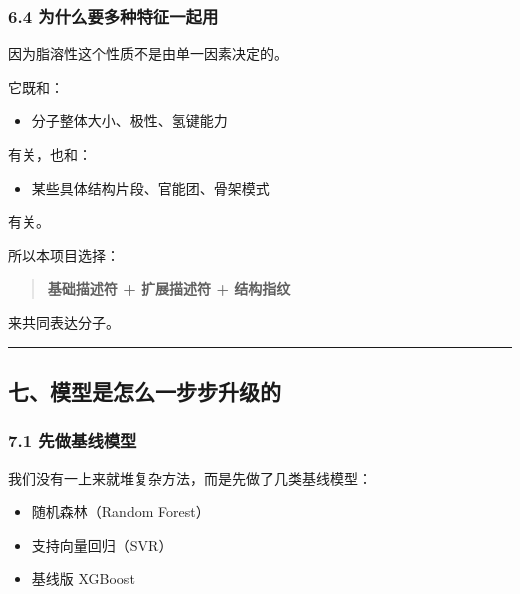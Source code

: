 \documentclass[
  ,
]{ctexart}
\providecommand{\tightlist}{%
  \setlength{\itemsep}{0pt}\setlength{\parskip}{0pt}}
\begin{document}
\hypertarget{ux4e3aux4ec0ux4e48ux8981ux591aux79cdux7279ux5f81ux4e00ux8d77ux7528}{%
\subsubsection{6.4
为什么要多种特征一起用}\label{ux4e3aux4ec0ux4e48ux8981ux591aux79cdux7279ux5f81ux4e00ux8d77ux7528}}

因为脂溶性这个性质不是由单一因素决定的。

它既和：

\begin{itemize}
\tightlist
\item
  分子整体大小、极性、氢键能力
\end{itemize}

有关，也和：

\begin{itemize}
\tightlist
\item
  某些具体结构片段、官能团、骨架模式
\end{itemize}

有关。

所以本项目选择：

\begin{quote}
\textbf{基础描述符 + 扩展描述符 + 结构指纹}
\end{quote}

来共同表达分子。

\begin{center}\rule{0.5\linewidth}{0.5pt}\end{center}

\hypertarget{ux4e03ux6a21ux578bux662fux600eux4e48ux4e00ux6b65ux6b65ux5347ux7ea7ux7684}{%
\subsection{七、模型是怎么一步步升级的}\label{ux4e03ux6a21ux578bux662fux600eux4e48ux4e00ux6b65ux6b65ux5347ux7ea7ux7684}}

\hypertarget{ux5148ux505aux57faux7ebfux6a21ux578b}{%
\subsubsection{7.1
先做基线模型}\label{ux5148ux505aux57faux7ebfux6a21ux578b}}

我们没有一上来就堆复杂方法，而是先做了几类基线模型：

\begin{itemize}
\tightlist
\item
  随机森林（Random Forest）
\item
  支持向量回归（SVR）
\item
  基线版 XGBoost
\end{itemize}
\end{document}
